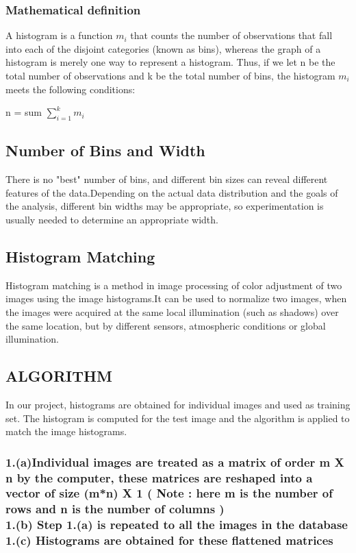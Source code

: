 \documentclass[10pt,a4paper]{article}
\begin{document}
\subsubsection{Mathematical definition}
A histogram is a function $m_i$ that counts the number of observations that fall into each of the disjoint categories (known as bins), whereas the graph of a histogram is merely one way to represent a histogram. Thus, if we let n be the total number of observations and k be the total number of bins, the histogram $m_i$ meets the following conditions:

    n = sum $\displaystyle\sum\limits_{i=1}^k m_i$ 
  
\subsection{Number of  Bins and Width}
There is no "best" number of bins, and different bin sizes can reveal different features of the data.Depending on the actual data distribution and the goals of the analysis, different bin widths may be appropriate, so experimentation is usually needed to determine an appropriate width.
   
\subsection{Histogram Matching}
Histogram matching is a method in image processing of color adjustment of two images using the image histograms.It can be used to normalize two images, when the images were acquired at the same local illumination (such as shadows) over the same location, but by different sensors, atmospheric conditions or global illumination.

\subsection{ALGORITHM}
In our project, histograms are obtained for individual images and used as training set. The histogram is computed for the test image and the algorithm is applied to match the image histograms.
\subsubsection{1.(a)Individual images are treated as a matrix of order m X n by the computer, these matrices are reshaped into a vector of size (m*n) X 1 ( Note : here m is the number of rows and n is the number of columns ) \\
    1.(b) Step 1.(a) is repeated to all the images in the database \\
    1.(c) Histograms are obtained for these flattened matrices}
\end{document}

